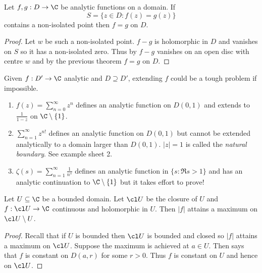 \documentclass[a4paper]{article}
\begin{document}
\begin{corollary}
  Let \(f, g: D \to \C\) be analytic functions on a domain. If
  \[
    S = \{z \in D: f(z) = g(z)\}
  \]
  contains a non-isolated point then \(f = g\) on \(D\).
\end{corollary}

\begin{proof}
  Let \(w\) be such a non-isolated point. \(f - g\) is holomorphic in \(D\) and vanishes on \(S\) so it has a non-isolated zero. Thus by  \(f - g\) vanishes on an open disc with centre \(w\) and by the previous theorem \(f = g\) on \(D\).
\end{proof}

\begin{remark}
  Given \(f: D' \to \C\) analytic and \(D \supseteq D'\), extending \(f\) could be a tough problem if impossible.
\end{remark}

\begin{eg}\leavevmode
  \begin{enumerate}
  \item \(f(z) = \sum_{n = 0}^\infty z^n\) defines an analytic function on \(D(0, 1)\) and extends to \(\frac{1}{1 - z}\) on \(\C \setminus \{1\}\).
  \item \(\sum_{n = 1}^\infty z^{n!}\) defines an analytic function on \(D(0, 1)\) but cannot be extended analytically to a domain larger than \(D(0, 1)\). \(|z| = 1\) is called the \emph{natural boundary}. See example sheet 2.
  \item \(\zeta(s) = \sum_{n = 1}^\infty \frac{1}{n^s}\) defines an analytic function in \(\{s: \Re s > 1\}\) and has an analytic continuation to \(\C \setminus \{1\}\) but it takes effort to prove!
  \end{enumerate}
\end{eg}

\begin{corollary}
  Let \(U \subseteq \C\) be a bounded domain. Let \(\cl U\) be the closure of \(U\) and \(f: \cl U \to \C\) continuous and holomorphic in \(U\). Then \(|f|\) attains a maximum on \(\cl U \setminus U\).
\end{corollary}

\begin{proof}
  Recall that if \(U\) is bounded then \(\cl U\) is bounded and closed so \(|f|\) attains a maximum on \(\cl U\). Suppose the maximum is achieved at \(a \in U\). Then  says that \(f\) is constant on \(D(a, r)\) for some \(r > 0\). Thus \(f\) is constant on \(U\) and hence on \(\cl U\).
\end{proof}
\end{document}
